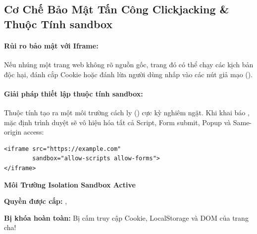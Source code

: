
\subsection{Cơ Chế Bảo Mật Tấn Công Clickjacking \& Thuộc Tính sandbox}

\paragraph{Rủi ro bảo mật với Iframe:}
Nếu nhúng một trang web không rõ nguồn gốc, trang đó có thể chạy các kịch bản độc hại, đánh cắp Cookie hoặc đánh lừa người dùng nhấp vào các nút giả mạo ().

\paragraph{Giải pháp thiết lập thuộc tính sandbox:}
Thuộc tính  tạo ra một môi trường cách ly () cực kỳ nghiêm ngặt. Khi khai báo , mặc định trình duyệt sẽ vô hiệu hóa tất cả Script, Form submit, Popup và Same-origin access:
\begin{codeWindow}
\begin{lstlisting}[language=HTML5]
<iframe src="https://example.com" 
        sandbox="allow-scripts allow-forms">
</iframe>
\end{lstlisting}
\end{codeWindow}

\begin{browserWindow}[https://example.com (sandbox="allow-scripts allow-forms")]
\centering\sffamily\vspace{4pt}
{\bfseries\color{accentOrange}\large Môi Trường Isolation Sandbox Active} \par\vspace{6pt}
\small\textbf{Quyền được cấp:} ,  \par\vspace{4pt}
\small\textcolor{warnBorder}{\textbf{Bị khóa hoàn toàn:}} Bị cấm truy cập Cookie, LocalStorage và DOM của trang cha! \par\vspace{4pt}
\end{browserWindow}

